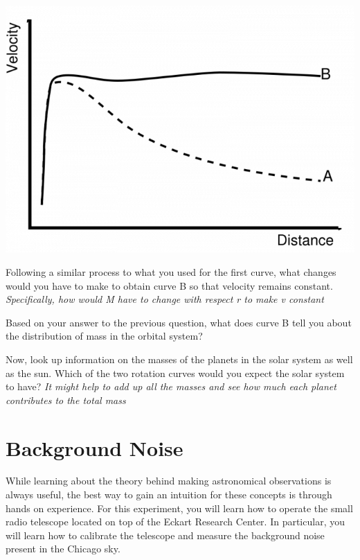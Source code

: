 \includegraphics[scale = .5]{srt-background-rotation/galactic_rotation_curve}

\begin{steps}
	\item Following a similar process to what you used for the first curve, what changes would you have to make to obtain curve B so that velocity remains constant. \textit{Specifically, how would M have to change with respect r to make v constant}
	
	\item Based on your answer to the previous question, what does curve B tell you about the distribution of mass in the orbital system? 
	
	\item Now, look up information on the masses of the planets in the solar system as well as the sun. Which of the two rotation curves would you expect the solar system to have? \textit{It might help to add up all the masses and see how much each planet contributes to the total mass}
	
\end{steps}
	


\section{Background Noise} %
While learning about the theory behind making astronomical observations is always useful, the best way to gain an intuition for these concepts is through hands on experience. For this experiment, you will learn how to operate the small radio telescope located on top of the Eckart Research Center. In particular, you will learn how to calibrate the telescope and measure the background noise present in the Chicago sky.

